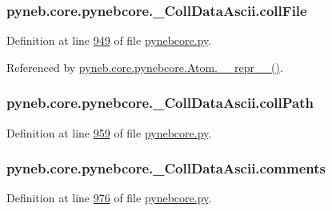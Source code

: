 \subsubsection[{coll\+File}]{\setlength{\rightskip}{0pt plus 5cm}pyneb.\+core.\+pynebcore.\+\_\+\+Coll\+Data\+Ascii.\+coll\+File}\label{classpyneb_1_1core_1_1pynebcore_1_1___coll_data_ascii_a8f7186365d566d4de80bf20b41b51c75}


Definition at line \hyperlink{pynebcore_8py_source_l00949}{949} of file \hyperlink{pynebcore_8py_source}{pynebcore.\+py}.



Referenced by \hyperlink{pynebcore_8py_source_l02544}{pyneb.\+core.\+pynebcore.\+Atom.\+\_\+\+\_\+repr\+\_\+\+\_\+()}.

\hypertarget{classpyneb_1_1core_1_1pynebcore_1_1___coll_data_ascii_aa407510c78da8c376cd7d82a2ec87ba4}{}
\subsubsection[{coll\+Path}]{\setlength{\rightskip}{0pt plus 5cm}pyneb.\+core.\+pynebcore.\+\_\+\+Coll\+Data\+Ascii.\+coll\+Path}\label{classpyneb_1_1core_1_1pynebcore_1_1___coll_data_ascii_aa407510c78da8c376cd7d82a2ec87ba4}


Definition at line \hyperlink{pynebcore_8py_source_l00959}{959} of file \hyperlink{pynebcore_8py_source}{pynebcore.\+py}.

\hypertarget{classpyneb_1_1core_1_1pynebcore_1_1___coll_data_ascii_ace4b313bdacd14dea0112b9ff7fe0b7c}{}
\subsubsection[{comments}]{\setlength{\rightskip}{0pt plus 5cm}pyneb.\+core.\+pynebcore.\+\_\+\+Coll\+Data\+Ascii.\+comments}\label{classpyneb_1_1core_1_1pynebcore_1_1___coll_data_ascii_ace4b313bdacd14dea0112b9ff7fe0b7c}


Definition at line \hyperlink{pynebcore_8py_source_l00976}{976} of file \hyperlink{pynebcore_8py_source}{pynebcore.\+py}.




